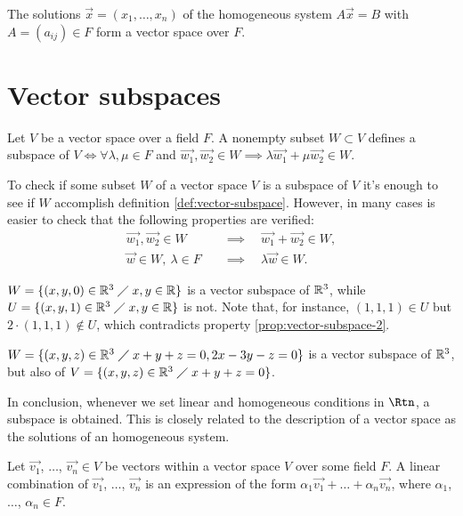 \begin{example}
    The solutions $\vec{x} = \left( x_1, \ldots, x_n \right) $ of the homogeneous system $A\vec{x} = B$
    with $A = \left( a_{ij} \right) \in F$ form a vector space over $F$.
\end{example}

\section{Vector subspaces}
\begin{defi} \label{def:vector-subspace}
    Let $V$ be a vector space over a field $F$. A nonempty subset $W\subset V$ defines a subspace of $V
    \iff \forall \lambda, \mu\in F$ and $\vec{w_1}, \vec{w_2}\in W\implies \lambda\vec{w_1} +
        \mu\vec{w_2}\in W$.
\end{defi}

To check if some subset $W$ of a vector space $V$ is a subspace of $V$ it's enough to see if $W$ accomplish
definition \ref{def:vector-subspace}. However, in many cases is easier to check that the following properties
are verified:
\begin{align} \label{prop:vector-subspace-2}
    \vec{w_1}, \vec{w_2}\in W &\quad\implies\quad \vec{w_1} + \vec{w_2}\in W, \\
    \vec{w}\in W,\ \lambda\in F&\quad\implies\quad \lambda\vec{w}\in W.
\end{align}

\begin{example}
    $W = \{\left( x, y, 0 \right)\in \mathbb{R}^3\;\diagup\; x, y\in\mathbb{R}\} $ is a vector subspace of $\mathbb{R}^3$, while $U = \{\left( x, y, 1 \right) \in\mathbb{R}^3\;\diagup\; x, y\in\mathbb{R}\} $ is not. Note that, for instance, $\left( 1, 1, 1 \right)\in U$ but
    $2\cdot\left( 1, 1, 1 \right) \not\in U$, which contradicts property \ref{prop:vector-subspace-2}.
\end{example}

\begin{example}
    $W = \{\left( x, y, z \right) \in\mathbb{R}^3\;\diagup\; x + y + z = 0, 2x - 3y - z = 0\} $ is a vector subspace of $\mathbb{R}^3$,
    but also of $V = \{\left( x, y, z \right) \in\mathbb{R}^3\;\diagup\; x + y + z = 0\} $.
\end{example}

In conclusion, whenever we set linear and homogeneous conditions in $\Rtn$, a subspace is obtained. This is
closely related to the description of a vector space as the solutions of an homogeneous system.

\begin{defi}
    Let $\vec{v_1}$, $\ldots$, $\vec{v_n}\in V$ be vectors within a vector space $V$ over some field $F$. 
    A linear combination of $\vec{v_1}$, $\ldots$, $\vec{v_n}$ is an expression of the form $\alpha_1
    \vec{v_1} + \ldots + \alpha_n\vec{v_n}$, where  $\alpha_1$, $\ldots$, $\alpha_n\in F$.
\end{defi}

